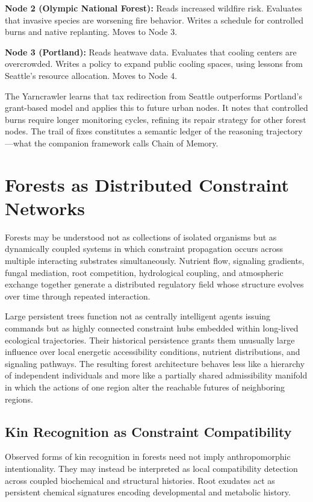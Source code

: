 \noindent\textbf{Node 2 (Olympic National Forest):} Reads increased wildfire risk.
Evaluates that invasive species are worsening fire behavior. Writes a schedule for
controlled burns and native replanting. Moves to Node 3.

\noindent\textbf{Node 3 (Portland):} Reads heatwave data. Evaluates that cooling
centers are overcrowded. Writes a policy to expand public cooling spaces, using
lessons from Seattle's resource allocation. Moves to Node 4.
\medskip

The Yarncrawler learns that tax redirection from Seattle outperforms Portland's
grant-based model and applies this to future urban nodes. It notes that controlled
burns require longer monitoring cycles, refining its repair strategy for other
forest nodes. The trail of fixes constitutes a semantic ledger of the reasoning
trajectory---what the companion framework calls Chain of Memory.

\section{Forests as Distributed Constraint Networks}
\label{sec:forests}

\claimP Forests may be understood not as collections of isolated organisms but as
dynamically coupled systems in which constraint propagation occurs across multiple
interacting substrates simultaneously. Nutrient flow, signaling gradients, fungal
mediation, root competition, hydrological coupling, and atmospheric exchange
together generate a distributed regulatory field whose structure evolves over time
through repeated interaction.

Large persistent trees function not as centrally intelligent agents issuing
commands but as highly connected constraint hubs embedded within long-lived
ecological trajectories. Their historical persistence grants them unusually large
influence over local energetic accessibility conditions, nutrient distributions,
and signaling pathways. The resulting forest architecture behaves less like a
hierarchy of independent individuals and more like a partially shared admissibility
manifold in which the actions of one region alter the reachable futures of
neighboring regions.

\subsection{Kin Recognition as Constraint Compatibility}

Observed forms of kin recognition in forests need not imply anthropomorphic
intentionality. They may instead be interpreted as local compatibility detection
across coupled biochemical and structural histories. Root exudates act as
persistent chemical signatures encoding developmental and metabolic history.

